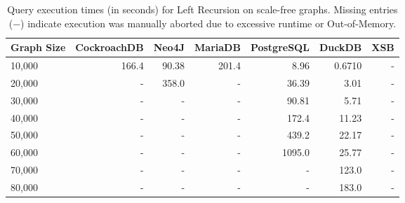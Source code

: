 \begin{table}[htpb]
\centering
\caption{Query execution times (in seconds) for Left Recursion on scale-free graphs. Missing entries ($-$) indicate execution was manually aborted due to excessive runtime or Out-of-Memory.}
\label{tab:scale_free_left_recursion}
\begin{tabular}{lrrrrrr}
\toprule
\textbf{Graph Size} & \textbf{CockroachDB} & \textbf{Neo4J} & \textbf{MariaDB} & \textbf{PostgreSQL} & \textbf{DuckDB} & \textbf{XSB} \\
\midrule
10,000 & 166.4 & 90.38 & 201.4 & 8.96 & 0.6710 & - \\
20,000 & - & 358.0 & - & 36.39 & 3.01 & - \\
30,000 & - & - & - & 90.81 & 5.71 & - \\
40,000 & - & - & - & 172.4 & 11.23 & - \\
50,000 & - & - & - & 439.2 & 22.17 & - \\
60,000 & - & - & - & 1095.0 & 25.77 & - \\
70,000 & - & - & - & - & 123.0 & - \\
80,000 & - & - & - & - & 183.0 & - \\
\bottomrule
\end{tabular}
\end{table}
